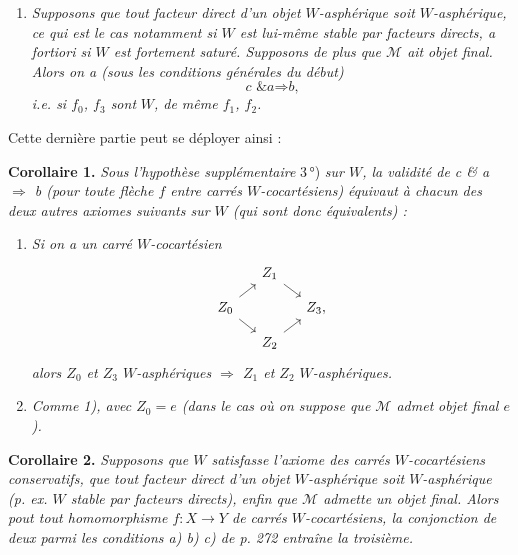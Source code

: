 \documentclass[11pt]{article}
\newcommand{\msp}[1]{\marginpar{\footnotesize [#1]}}
\begin{document}
\begin{enumerate}
\msp{page 274}

\item[\textit{3°)}] \textit{Supposons que tout facteur direct d'un objet $W$-asphérique soit $W$-asphérique, ce qui est le cas notamment si $W$ est lui-même stable par facteurs directs, a fortiori si $W$ est fortement saturé. Supposons de plus que $\mathcal{M}$ ait} \textit{objet final. Alors on a (sous les conditions générales du début)}
\[
\textit{c \& a} \Longrightarrow \textit{b,}
\]
\textit{i.e. si $f_0$, $f_3$ sont} \textit{$W$, de même $f_1$, $f_2$.}
\end{enumerate}

Cette dernière partie peut se déployer ainsi :

\textbf{Corollaire 1.} \textit{Sous l'hypothèse supplémentaire} \textup{3\,°)} \textit{sur $W$, la validité de c \& a $\Longrightarrow$ b (pour toute flèche $f$ entre carrés $W$-cocartésiens) équivaut à chacun des deux autres axiomes suivants sur $W$ (qui sont donc équivalents) :}

\begin{enumerate}
\item[\textit{1)}] \textit{Si on a un carré $W$-cocartésien}
\[
\begin{tikzcd}[column sep=small, row sep=small]
 & Z_1 \arrow[dr] & \\
Z_0 \arrow[ur] \arrow[dr] & & Z_3, \\
 & Z_2 \arrow[ur] &
\end{tikzcd}
\]
\textit{alors $Z_0$ et $Z_3$ $W$-asphériques $\Longrightarrow$ $Z_1$ et $Z_2$ $W$-asphériques.}
\item[\textit{1$'$)}] \textit{Comme 1), avec $Z_0 = e$ (dans le cas où on suppose que $\mathcal{M}$ admet} \textit{objet final $e$).}
\end{enumerate}

\msp{page 275}

\textbf{Corollaire 2.} \textit{Supposons que $W$ satisfasse l'axiome des carrés $W$-cocartésiens conservatifs, que tout facteur direct d'un objet $W$-asphérique soit $W$-asphérique (p. ex. $W$ stable par facteurs directs), enfin que $\mathcal{M}$ admette un objet final. Alors pout tout homomorphisme $f : X \longrightarrow Y$ de carrés $W$-cocartésiens, la conjonction de deux parmi les conditions a) b) c) de p. 272 entraîne la troisième.} %
\end{document}
